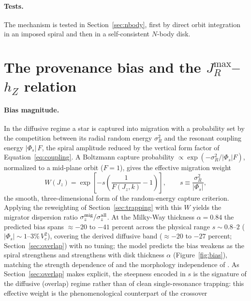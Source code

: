 \documentclass[twocolumn]{aastex701}
\newcommand{\Jz}{J_z}
\newcommand{\JR}{J_R}
\newcommand{\hZ}{h_Z}
\newcommand{\sigz}{\sigma_z}
\newcommand{\sigR}{\sigma_R}
\begin{document}
\paragraph{Tests.} The mechanism is tested in Section~\ref{sec:nbody}, first by
direct orbit integration in an imposed spiral and then in a self-consistent $N$-body
disk.

\section{The provenance bias and the \texorpdfstring{$\JR^{\max}$--$\hZ$}{JRmax-hZ} relation}
\label{sec:bias}

\paragraph{Bias magnitude.} In the diffusive regime a star is captured into
migration with a probability set by the competition between its radial random energy
$\sigR^2$ and the resonant coupling energy $|\Phi_s|\,F$, the spiral amplitude
reduced by the vertical form factor of Equation~\eqref{eq:coupling}. A Boltzmann capture
probability $\propto\exp(-\sigR^2/|\Phi_s|F)$, normalized to a mid-plane orbit
($F=1$), gives the effective migration weight
%
\begin{equation}
  W(\Jz)=\exp\!\left[-s\left(\frac{1}{F(\Jz,k)}-1\right)\right],
  \qquad s\equiv\frac{\sigR^2}{|\Phi_s|},
  \label{eq:effweight}
\end{equation}
%
the smooth, three-dimensional form of the \citet{DanielWyse2015} random-energy
capture criterion. Applying the reweighting of Section~\ref{sec:trapping} with this
$W$ yields the migrator dispersion ratio $\sigz^{\rm mig}/\sigz^{\rm all}$. At the Milky-Way thickness $\alpha=0.84$ the
predicted bias spans ${\approx}-20$ to $-41$ percent across the physical range
$s\sim0.8$--$2$ ($|\Phi_s|\sim1$--$3\%\,V_c^2$), covering the derived diffusive band
(${\approx}-20$ to $-27$ percent; Section~\ref{sec:overlap}) with no tuning; the model predicts
the bias weakens as the spiral strengthens and strengthens with disk thickness
$\alpha$ (Figure~\ref{fig:bias}), matching the strength dependence of
\citet{Mikkola2020} and the morphology independence of \citet{VeraCiro2016imprint}. As
Section~\ref{sec:overlap} makes explicit, the steepness encoded in $s$ is the
signature of the diffusive (overlap) regime rather than of clean single-resonance
trapping: this effective weight is the phenomenological counterpart of the crossover
\end{document}
